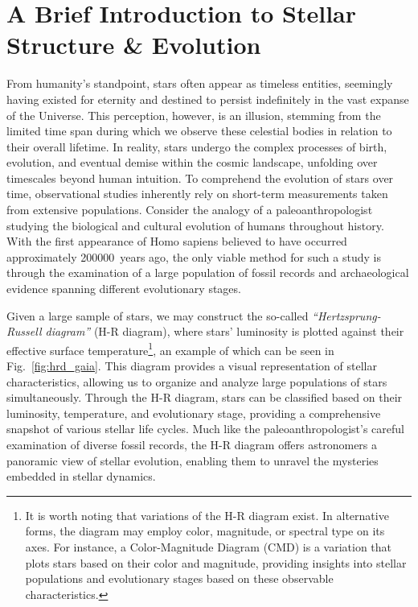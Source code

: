\documentclass[main.tex]{subfiles}
\begin{document}
    
    {
    \adjustmtc
    \minitoc
    \newpage
    }
    
    
    
    \section{A Brief Introduction to Stellar Structure \& Evolution}\label{sec:ch1:intro}
    From humanity's standpoint, stars often appear as timeless entities, seemingly having existed for eternity and destined to persist indefinitely in the vast expanse of the Universe. This perception, however, is an illusion, stemming from the limited time span during which we observe these celestial bodies in relation to their overall lifetime. In reality, stars undergo the complex processes of birth, evolution, and eventual demise within the cosmic landscape, unfolding over timescales beyond human intuition. To comprehend the evolution of stars over time, observational studies inherently rely on short-term measurements taken from extensive populations.
    Consider the analogy of a paleoanthropologist studying the biological and cultural evolution of humans throughout history. With the first appearance of Homo sapiens believed to have occurred approximately \SI{200000}{years} ago, the only viable method for such a study is through the examination of a large population of fossil records and archaeological evidence spanning different evolutionary stages.

    Given a large sample of stars, we may construct the so-called \textit{``Hertzsprung-Russell diagram''} (H-R diagram), where stars' luminosity is plotted against their effective surface temperature\footnote{It is worth noting that variations of the H-R diagram exist. In alternative forms, the diagram may employ color, magnitude, or spectral type on its axes. For instance, a Color-Magnitude Diagram (CMD) is a variation that plots stars based on their color and magnitude, providing insights into stellar populations and evolutionary stages based on these observable characteristics.}, an example of which can be seen in Fig.~\ref{fig:hrd_gaia}. This diagram provides a visual representation of stellar characteristics, allowing us to organize and analyze large populations of stars simultaneously. Through the H-R diagram, stars can be classified based on their luminosity, temperature, and evolutionary stage, providing a comprehensive snapshot of various stellar life cycles. Much like the paleoanthropologist's careful examination of diverse fossil records, the H-R diagram offers astronomers a panoramic view of stellar evolution, enabling them to unravel the mysteries embedded in stellar dynamics.
\end{document}
